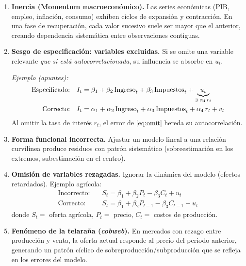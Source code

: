 \documentclass[11pt, letterpaper]{article}
\begin{document}
\begin{enumerate}[label=\textbf{\arabic*.}]

  \item \textbf{Inercia (Momentum macroecon\'omico).}
  Las series econ\'omicas (PIB, empleo, inflaci\'on, consumo) exhiben ciclos de
  expansi\'on y contracci\'on. En una fase de recuperaci\'on, cada valor sucesivo
  suele ser mayor que el anterior, creando dependencia sistem\'atica entre
  observaciones contiguas.

  \item \textbf{Sesgo de especificaci\'on: variables excluidas.}
  Si se omite una variable relevante \emph{que s\'i est\'a autocorrelacionada},
  su influencia se absorbe en $u_t$.

  \medskip
  \noindent\textit{Ejemplo (apuntes):}
  \begin{align}
    \text{Especificado:} &\quad
      I_t = \beta_1 + \beta_2\,\text{Ingreso}_t + \beta_3\,\text{Impuestos}_t
            + \underbrace{u_t}_{\ni\,\alpha_4\,r_t} \label{eq:omit}\\
    \text{Correcto:} &\quad
      I_t = \alpha_1 + \alpha_2\,\text{Ingreso}_t + \alpha_3\,\text{Impuestos}_t
            + \alpha_4\,r_t + v_t \notag
  \end{align}
  Al omitir la tasa de inter\'es $r_t$, el error de \eqref{eq:omit}
  hereda su autocorrelaci\'on.

  \item \textbf{Forma funcional incorrecta.}
  Ajustar un modelo lineal a una relaci\'on curvilínea produce residuos con
  patr\'on sistem\'atico (sobreestimaci\'on en los extremos, subestimaci\'on
  en el centro).

  \item \textbf{Omisi\'on de variables rezagadas.}
  Ignorar la din\'amica del modelo (efectos retardados). Ejemplo agr\'icola:
  \begin{align}
    \text{Incorrecto:} &\quad S_t = \beta_1 + \beta_2 P_t - \beta_3 C_t + u_t \\
    \text{Correcto:}   &\quad S_t = \beta_1 + \beta_2 P_{t-1} - \beta_3 C_{t-1} + u_t
  \end{align}
  donde $S_t=$ oferta agr\'icola, $P_t=$ precio, $C_t=$ costos de producci\'on.

  \item \textbf{Fen\'omeno de la telara\~na (\textit{cobweb}).}
  En mercados con rezago entre producci\'on y venta, la oferta actual responde
  al precio del periodo anterior, generando un patr\'on c\'iclico de
  sobreproducci\'on/subproducci\'on que se refleja en los errores del modelo.


\end{enumerate}
\end{document}
